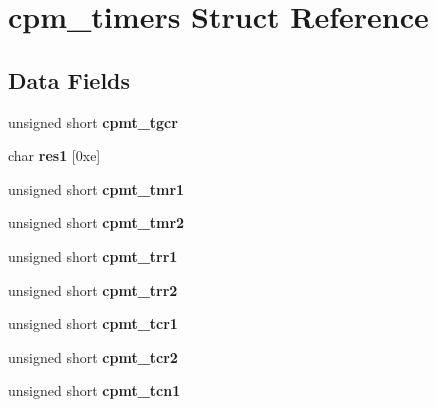 \hypertarget{structcpm__timers}{}\section{cpm\+\_\+timers Struct Reference}
\label{structcpm__timers}
\subsection*{Data Fields}
\begin{DoxyCompactItemize}
\item 
\mbox{\label{structcpm__timers_a7b79998ad7259725a39eb9560deebaf5}} 
unsigned short {\bfseries cpmt\+\_\+tgcr}
\item 
\mbox{\label{structcpm__timers_ab19e050166ea195f62f2ca8777c1da51}} 
char {\bfseries res1} \mbox{[}0xe\mbox{]}
\item 
\mbox{\label{structcpm__timers_a342516a5f62dc4298030955a7ebd1356}} 
unsigned short {\bfseries cpmt\+\_\+tmr1}
\item 
\mbox{\label{structcpm__timers_afb9ab248a654d66ce4edbed280e9b230}} 
unsigned short {\bfseries cpmt\+\_\+tmr2}
\item 
\mbox{\label{structcpm__timers_a612872521ee7e494f8463900cccc088f}} 
unsigned short {\bfseries cpmt\+\_\+trr1}
\item 
\mbox{\label{structcpm__timers_a34fb1962f12bcf8b966bb1d575b895b2}} 
unsigned short {\bfseries cpmt\+\_\+trr2}
\item 
\mbox{\label{structcpm__timers_ab95d8604cb3cd5fb121f2b976863c0cb}} 
unsigned short {\bfseries cpmt\+\_\+tcr1}
\item 
\mbox{\label{structcpm__timers_ad6cf1236a4304261d0f56381236343ba}} 
unsigned short {\bfseries cpmt\+\_\+tcr2}
\item 
\mbox{\label{structcpm__timers_a6d7195c675fe20ecc5e7e2d703a424db}} 
unsigned short {\bfseries cpmt\+\_\+tcn1}
\item 
\mbox{\label{structcpm__timers_af72cf590568e33756b77b29660e1bb25}} 

\end{DoxyCompactItemize}
